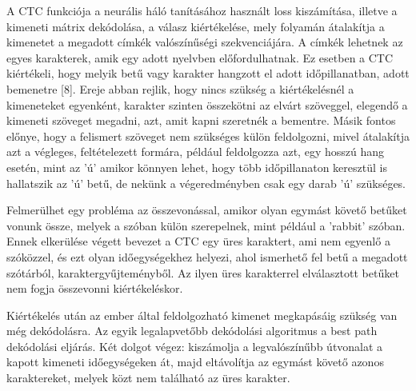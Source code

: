 A CTC funkciója a neurális háló tanításához használt loss kiszámítása, illetve a kimeneti mátrix dekódolása, a válasz kiértékelése, mely folyamán átalakítja a kimenetet a megadott címkék valószínűségi szekvenciájára. A címkék lehetnek az egyes karakterek, amik egy adott nyelvben előfordulhatnak. Ez esetben a CTC kiértékeli, hogy melyik betű vagy karakter hangzott el adott időpillanatban, adott bemenetre [8]. Ereje abban rejlik, hogy nincs szükség a kiértékelésnél a kimeneteket egyenként, karakter szinten összekötni az elvárt szöveggel, elegendő a kimeneti szöveget megadni, azt, amit kapni szeretnék a bementre. Másik fontos előnye, hogy a felismert szöveget nem szükséges külön feldolgozni, mivel átalakítja azt a végleges, feltételezett formára, például feldolgozza azt, egy hosszú hang esetén, mint az ’ú’ amikor könnyen lehet, hogy több időpillanaton keresztül is hallatszik az ’ú’ betű, de nekünk a végeredményben csak egy darab ’ú’ szükséges.

Felmerülhet egy probléma az összevonással, amikor olyan egymást követő betűket vonunk össze, melyek a szóban külön szerepelnek, mint például a ’rabbit’ szóban. Ennek elkerülése végett bevezet a CTC egy üres karaktert, ami nem egyenlő a szóközzel, és ezt olyan időegységekhez helyezi, ahol ismerhető fel betű a megadott szótárból, karaktergyűjteményből. Az ilyen üres karakterrel elválasztott betűket nem fogja összevonni kiértékeléskor.

Kiértékelés után az ember által feldolgozható kimenet megkapásáig szükség van még dekódolásra. Az egyik legalapvetőbb dekódolási algoritmus a best path dekódolási eljárás. Két dolgot végez: kiszámolja a legvalószínűbb útvonalat a kapott kimeneti időegységeken át, majd eltávolítja az egymást követő azonos karaktereket, melyek közt nem található az üres karakter.
